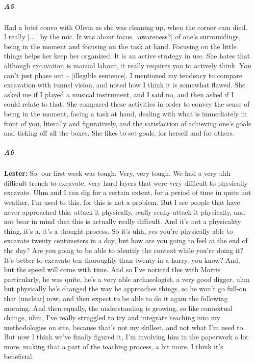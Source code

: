 \documentclass[
]{article}
\begin{document}
\subparagraph{A5}\label{sec-A5}

Had a brief convo with Olivia as she was cleaning up, when the corner
cam died. I really {[}.\ldots{]} by the mic. It was about focus,
{[}awareness?{]} of one's surroundings, being in the moment and focusing
on the task at hand. Focusing on the little things helps her keep her
organized. It is an active strategy in use. She hates that although
excavation is manual labour, it really requires you to actively think.
You can't just phase out -- {[}illegible sentence{]}. I mentioned my
tendency to compare excavation with tunnel vision, and noted how I think
it is somewhat flawed. She asked me if I played a musical instrument,
and I said no, and then asked if I could relate to that. She compared
these activities in order to convey the sense of being in the moment,
facing a task at hand, dealing with what is immediately in front of you,
literally and figuratively, and the satisfaction of achieving one's
goals and ticking off all the boxes. She likes to set goals, for herself
and for others.

\subparagraph{A6}\label{sec-A6}

\textbf{Lester:} So, our first week was tough. Very, very tough. We had
a very uhh difficult trench to excavate, very hard layers that were very
difficult to physically excavate. Uhm and I can dig for a certain
extent, for a period of time in quite hot weather, I'm used to this, for
this is not a problem. But I see people that have never approached this,
attack it physically, really really attack it physically, and not bear
in mind that this is actually really difficult. And it's not a
physicality thing, it's a, it's a thought process. So it's uhh, yes
you're physically able to excavate twenty centimeters in a day, but how
are you going to feel at the end of the day? Are you going to be able to
identify the context while you're doing it? It's better to excavate ten
thoroughly than twenty in a hurry, you know? And, but the speed will
come with time. And so I've noticed this with Morris particularly, he
was quite, he's a very able archaeologist, a very good digger, uhm but
physically he's changed the way he approaches things, so he won't go
full-on that {[}unclear{]} now, and then expect to be able to do it
again the following morning. And then equally, the understanding is
growing, so like contextual change, uhm, I've really struggled to try
and integrate teaching into my methodologies on site, because that's not
my skillset, and not what I'm used to. But now I think we've finally
figured it, I'm involving him in the paperwork a lot more, making that a
part of the teaching process, a bit more. I think it's beneficial.
\end{document}
